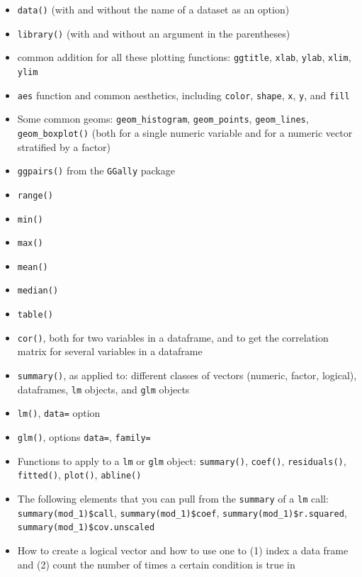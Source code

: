 \documentclass[]{book}
\providecommand{\tightlist}{%
  \setlength{\itemsep}{0pt}\setlength{\parskip}{0pt}}
\theoremstyle{definition}
\theoremstyle{definition}
\theoremstyle{definition}
\theoremstyle{remark}
\begin{document}
\begin{itemize}
\tightlist
\item
  \texttt{data()} (with and without the name of a dataset as an option)
\item
  \texttt{library()} (with and without an argument in the parentheses)
\item
  common addition for all these plotting functions: \texttt{ggtitle},
  \texttt{xlab}, \texttt{ylab}, \texttt{xlim}, \texttt{ylim}
\item
  \texttt{aes} function and common aesthetics, including \texttt{color},
  \texttt{shape}, \texttt{x}, \texttt{y}, and \texttt{fill}
\item
  Some common geoms: \texttt{geom\_histogram}, \texttt{geom\_points},
  \texttt{geom\_lines}, \texttt{geom\_boxplot()} (both for a single
  numeric variable and for a numeric vector stratified by a factor)
\item
  \texttt{ggpairs()} from the \texttt{GGally} package
\item
  \texttt{range()}
\item
  \texttt{min()}
\item
  \texttt{max()}
\item
  \texttt{mean()}
\item
  \texttt{median()}
\item
  \texttt{table()}
\item
  \texttt{cor()}, both for two variables in a dataframe, and to get the
  correlation matrix for several variables in a dataframe
\item
  \texttt{summary()}, as applied to: different classes of vectors
  (numeric, factor, logical), dataframes, \texttt{lm} objects, and
  \texttt{glm} objects
\item
  \texttt{lm()}, \texttt{data=} option
\item
  \texttt{glm()}, options \texttt{data=}, \texttt{family=}
\item
  Functions to apply to a \texttt{lm} or \texttt{glm} object:
  \texttt{summary()}, \texttt{coef()}, \texttt{residuals()},
  \texttt{fitted()}, \texttt{plot()}, \texttt{abline()}
\item
  The following elements that you can pull from the \texttt{summary} of
  a \texttt{lm} call: \texttt{summary(mod\_1)\$call},
  \texttt{summary(mod\_1)\$coef}, \texttt{summary(mod\_1)\$r.squared},
  \texttt{summary(mod\_1)\$cov.unscaled}
\item
  How to create a logical vector and how to use one to (1) index a data
  frame and (2) count the number of times a certain condition is true in

\end{itemize}
\end{document}
